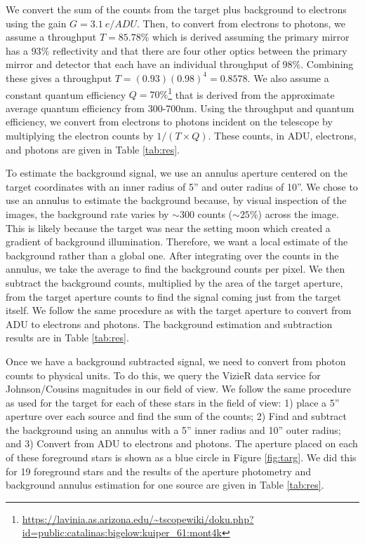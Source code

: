 \documentclass{aastex631}
\begin{document}
We convert the sum of the counts from the target plus background to electrons using the gain $G=3.1~e/ADU$. Then, to convert from electrons to photons, we assume a throughput $T=85.78\%$ which is derived assuming the primary mirror has a $93\%$ reflectivity and that there are four other optics between the primary mirror and detector that each have an individual throughput of $98\%$. Combining these gives a throughput $T=(0.93)(0.98)^4=0.8578$. We also assume a constant quantum efficiency $Q=70\%$\footnote{\url{https://lavinia.as.arizona.edu/~tscopewiki/doku.php?id=public:catalinas:bigelow:kuiper_61:mont4k}} that is derived from the approximate average quantum efficiency from 300-700nm. Using the throughput and quantum efficiency, we convert from electrons to photons incident on the telescope by multiplying the electron counts by $1/(T \times Q)$. These counts, in ADU, electrons, and photons are given in Table \ref{tab:res}.

To estimate the background signal, we use an annulus aperture centered on the target coordinates with an inner radius of 5'' and outer radius of 10''. We chose to use an annulus to estimate the background because, by visual inspection of the images, the background rate varies by $\sim300$ counts ($\sim25\%$) across the image. This is likely because the target was near the setting moon which created a gradient of background illumination. Therefore, we want a local estimate of the background rather than a global one. After integrating over the counts in the annulus, we take the average to find the background counts per pixel. We then subtract the background counts, multiplied by the area of the target aperture, from the target aperture counts to find the signal coming just from the target itself. We follow the same procedure as with the target aperture to convert from ADU to electrons and photons. The background estimation and subtraction results are in Table \ref{tab:res}.

Once we have a background subtracted signal, we need to convert from photon counts to physical units. To do this, we query the VizieR data service for Johnson/Cousins magnitudes in our field of view. We follow the same procedure as used for the target for each of these stars in the field of view: 1) place a 5'' aperture  over each source and find the sum of the counts; 2) Find and subtract the background using an annulus with a 5'' inner radius and 10'' outer radius; and 3) Convert from ADU to electrons and photons. The aperture placed on each of these foreground stars is shown as a blue circle in Figure \ref{fig:targ}. We did this for 19 foreground stars and the results of the aperture photometry and background annulus estimation for one source are given in Table \ref{tab:res}.
\end{document}
